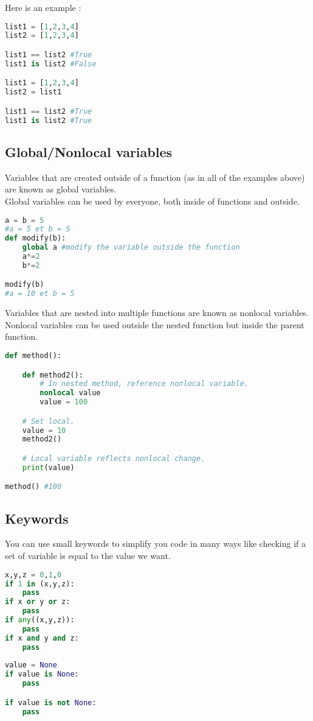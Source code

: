 \documentclass[a4paper, 12pt, titlepage]{scrartcl} %
\begin{document}
\vspace{5mm}

Here is an example :
\begin{lstlisting}[language=Python]
list1 = [1,2,3,4]
list2 = [1,2,3,4]

list1 == list2 #True
list1 is list2 #False

list1 = [1,2,3,4]
list2 = list1

list1 == list2 #True
list1 is list2 #True
\end{lstlisting} \vspace{5mm}

\subsection{Global/Nonlocal variables}
\label{subsec:Global/Nonlocal}
Variables that are created outside of a function (as in all of the examples above) are known as global variables.\\
Global variables can be used by everyone, both inside of functions and outside.
\begin{lstlisting}[language=Python]
a = b = 5
#a = 5 et b = 5
def modify(b):
	global a #modify the variable outside the function
	a*=2
	b*=2

modify(b)
#a = 10 et b = 5
\end{lstlisting} \vspace{5mm}

Variables that are nested into multiple functions are known as nonlocal variables. \\
Nonlocal variables can be used outside the nested function but inside the parent function.
\begin{lstlisting}[language=Python]
def method():

    def method2():
        # In nested method, reference nonlocal variable.
        nonlocal value
        value = 100

    # Set local.
    value = 10
    method2()

    # Local variable reflects nonlocal change.
    print(value)

method() #100
\end{lstlisting} \vspace{5mm}

\subsection{Keywords}
\label{subsec:Keyword}
You can use small keywords to simplify you code in many ways like checking if a set of variable is equal to the value we want.
\begin{lstlisting}[language=Python]
x,y,z = 0,1,0
if 1 in (x,y,z):
    pass
if x or y or z:
    pass
if any((x,y,z)):
    pass
if x and y and z:
    pass
    
value = None
if value is None:
    pass

if value is not None:
    pass
\end{lstlisting} \vspace{5mm}
\end{document}
